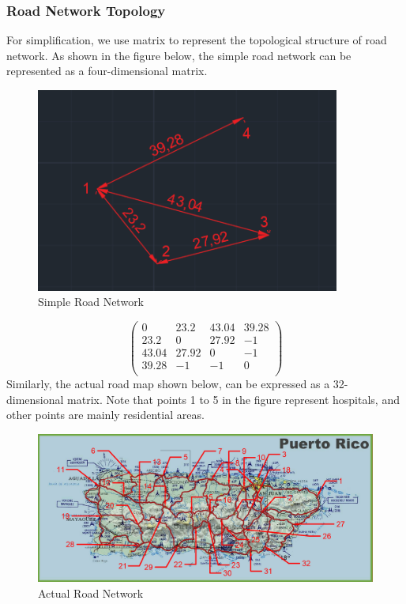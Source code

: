 \documentclass{mcmthesis}
\begin{document}
\subsubsection{Road Network Topology}
For simplification, we use matrix to represent the topological structure of road network. As shown in the figure below, the simple road network can be represented as a four-dimensional matrix. 
\begin{figure}[h]
	\small
	\centering
	\includegraphics[width=10cm]{9.png}
	\caption{Simple Road Network} \label{fig:4}
\end{figure}
\[
\begin{pmatrix}
{0} & {23.2 } & {43.04 }& {39.28 }  \\
{23.2 } & {0 } & {27.92 } & {-1 } \\
{43.04 } & {27.92  } & {0 } & {-1 } \\
{39.28 } & {-1  } & {-1 } & {0 } \\
\end{pmatrix} 
\]
Similarly, the actual road map shown below, can be expressed as a 32-dimensional matrix. Note that points 1 to 5 in the figure represent hospitals, and other points are mainly residential areas.
\begin{figure}[h]
	\small
	\centering
	\includegraphics[width=15cm]{6.png}
	\caption{Actual Road Network} \label{fig:4}
\end{figure}
\end{document}

